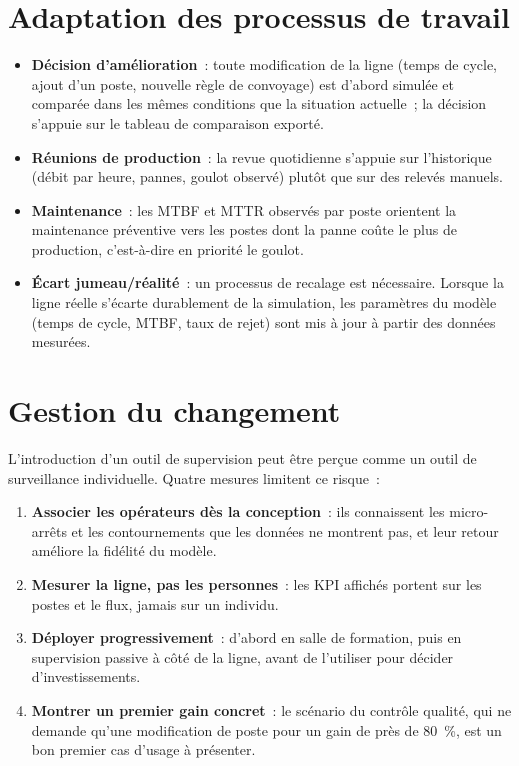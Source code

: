 \section{Adaptation des processus de travail}

\begin{itemize}
  \item \textbf{Décision d'amélioration}~: toute modification de la ligne (temps de cycle, ajout d'un poste, nouvelle règle de convoyage) est d'abord simulée et comparée dans les mêmes conditions que la situation actuelle~; la décision s'appuie sur le tableau de comparaison exporté.
  \item \textbf{Réunions de production}~: la revue quotidienne s'appuie sur l'historique (débit par heure, pannes, goulot observé) plutôt que sur des relevés manuels.
  \item \textbf{Maintenance}~: les \ac{MTBF} et \ac{MTTR} observés par poste orientent la maintenance préventive vers les postes dont la panne coûte le plus de production, c'est-à-dire en priorité le goulot.
  \item \textbf{Écart jumeau/réalité}~: un processus de recalage est nécessaire. Lorsque la ligne réelle s'écarte durablement de la simulation, les paramètres du modèle (temps de cycle, \ac{MTBF}, taux de rejet) sont mis à jour à partir des données mesurées.
\end{itemize}

\section{Gestion du changement}

L'introduction d'un outil de supervision peut être perçue comme un outil de surveillance individuelle. Quatre mesures limitent ce risque~:

\begin{enumerate}
  \item \textbf{Associer les opérateurs dès la conception}~: ils connaissent les micro-arrêts et les contournements que les données ne montrent pas, et leur retour améliore la fidélité du modèle.
  \item \textbf{Mesurer la ligne, pas les personnes}~: les \ac{KPI} affichés portent sur les postes et le flux, jamais sur un individu.
  \item \textbf{Déployer progressivement}~: d'abord en salle de formation, puis en supervision passive à côté de la ligne, avant de l'utiliser pour décider d'investissements.
  \item \textbf{Montrer un premier gain concret}~: le scénario du contrôle qualité, qui ne demande qu'une modification de poste pour un gain de près de 80~\%, est un bon premier cas d'usage à présenter.
\end{enumerate}

